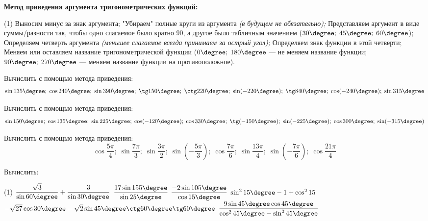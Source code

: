 \begin{class}[number=8]
	\begin{listofex}
		\item \textbf{Метод приведения аргумента тригонометрических функций:}
	\begin{tasks}(1)
		\task Выносим минус за знак аргумента;
		\task "Убираем"{ }полные круги из аргумента \textit{(в будущем не обязательно);}
		\task Представляем аргумент в виде суммы/разности так, чтобы одно слагаемое было кратно \( 90 \), а другое было табличным значением (\( 30\degree;\;45\degree;\;60\degree \));
		\task Определяем четверть аргумента \textit{(меньшее слагаемое всегда принимаем за острый угол);}
		\task Определяем знак функции в этой четверти;
		\task Меняем или оставляем название тригонометрической функции (\( 0\degree;\;180\degree \) --- не меняем название функции; \( 90\degree;\;270\degree \) --- меняем название функции на противоположное).
	\end{tasks}
	\item Вычислить с помощью метода приведения:
	\[ \sin135\degree;\;\cos240\degree;\;\sin390\degree;\;\tg150\degree;\;\ctg220\degree;\;\sin(-220\degree);\;\tg840\degree;\;\cos(-240\degree);\;\sin315\degree \]
	
		\item Вычислить с помощью метода приведения: \[ \sin150\degree;\;\cos135\degree;\;\sin225\degree;\;\cos(-120\degree);\;\cos330\degree;\;\tg(-150\degree);\;\sin(-225\degree);\;\cos300\degree;\;\sin(-315\degree) \]
		\item Вычислить с помощью метода приведения:
		\[ \cos\dfrac{5\pi}{4};\;\sin\dfrac{7\pi}{3};\;\sin\dfrac{3\pi}{2};\;\sin\left( -\dfrac{5\pi}{3} \right);\;\cos\dfrac{7\pi}{6};\;\sin\dfrac{13\pi}{4};\;\sin\left( -\dfrac{7\pi}{6}  \right);\;\cos\dfrac{21\pi}{4} \]
		\item Вычислить:
		\begin{tasks}(1)
			\task \( \dfrac{\sqrt{3}}{\sin60\degree}+\dfrac{3}{\sin30\degree} \)
			\task \( \dfrac{17\sin155\degree}{\sin25\degree} \)
			\task \( \dfrac{-2\sin105\degree}{\cos15\degree} \)
			\task \( \sin^215\degree-1+\cos^215 \)
			\task \( -\sqrt{27}\cos30\degree-\sqrt{2}\sin45\degree\ctg60\degree\tg60\degree\)
			\task \( \dfrac{9\sin45\degree\cos45\degree}{\cos^245\degree-\sin^245\degree} \)
		\end{tasks}
	\end{listofex}
\end{class}
